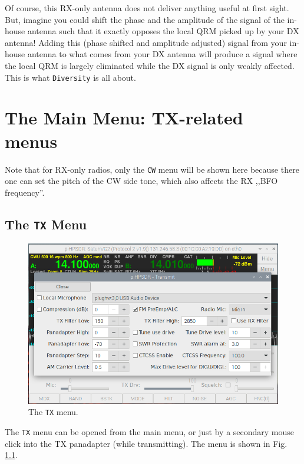 \documentclass[12pt]{book}
\def\bltt#1{\texttt{\color{blue}#1}}
\begin{document}
Of course, this RX-only antenna does not deliver anything useful at first sight. But, imagine
you could shift the phase and the amplitude of the signal of the in-house antenna such that it
exactly opposes the local QRM picked up by your DX antenna! Adding this (phase shifted and amplitude
adjusted) signal from your in-house antenna to what comes from your DX antenna will produce
a signal where the local QRM is largely eliminated while the DX signal is only weakly affected.
This is what \bltt{Diversity} is all about.

\chapter{The Main Menu: TX-related menus}

Note that for RX-only radios, only the \bltt{CW} menu will be shown here
because there one can set the pitch of the CW side tone, which also affects
the RX ,,BFO frequency''.

\section{The \texttt{TX} Menu}
\label{sec:txmenu}
\begin{figure}[ht!]
\center
\includegraphics[width=12cm]{TXMenu.png}
\caption{The \bltt{TX} menu.}
\label{fig:TXMenu}
\end{figure}

The \bltt{TX} menu can be opened from the main menu, or just by a secondary mouse click
into the TX panadapter (while transmitting). The menu is shown in Fig. \ref{fig:TXMenu}.
\end{document}
